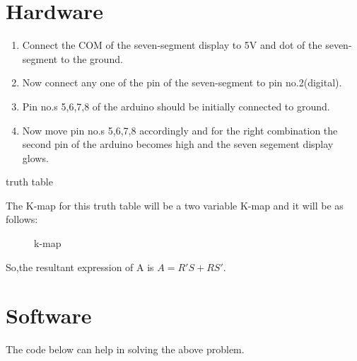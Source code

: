 \documentclass[12pt]{article}
\begin{document}
\section{Hardware}
	\begin{enumerate}
\item Connect the COM of the seven-segment display to 5V and dot of the seven-segment to the ground.
\item Now connect any one of the pin of the seven-segment to pin no.2(digital).
\item Pin no.s 5,6,7,8 of the arduino should be initially connected to ground.
\item Now move pin no.s 5,6,7,8 accordingly and for the right combination the second pin of the arduino becomes high and the seven segement display glows.
\end{enumerate}
\begin{table}[H]
\begin{center}
	
\end{center}
\caption{truth table}
\label{table 2}
\end{table}
The K-map for this truth table will be a two variable K-map and it will be as follows:
\begin{figure}[H]
	
\caption{k-map}
\label{fig2}
\end{figure}

So,the resultant expression of A is $A = R'S + RS'$.
\pagebreak
\section{Software}

The code below can help in solving the above problem.

\end{document}
